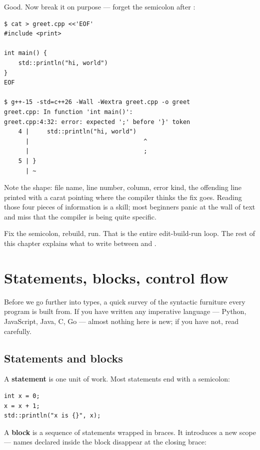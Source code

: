 Good. Now break it on purpose --- forget the semicolon after
:

\begin{lstlisting}[style=shell]
$ cat > greet.cpp <<'EOF'
#include <print>

int main() {
    std::println("hi, world")
}
EOF

$ g++-15 -std=c++26 -Wall -Wextra greet.cpp -o greet
greet.cpp: In function 'int main()':
greet.cpp:4:32: error: expected ';' before '}' token
    4 |     std::println("hi, world")
      |                                ^
      |                                ;
    5 | }
      | ~
\end{lstlisting}

Note the shape: file name, line number, column, error kind, the
offending line printed with a carat pointing where the compiler
thinks the fix goes. Reading those four pieces of information is a
skill; most beginners panic at the wall of text and miss that the
compiler is being quite specific.

Fix the semicolon, rebuild, run. That is the entire edit-build-run
loop. The rest of this chapter explains what to write between
 and \code{\}}.

\section{Statements, blocks, control flow}
\label{sec:cpp:flow}

Before we go further into types, a quick survey of the syntactic
furniture every \cpp{} program is built from. If you have written
any imperative language --- Python, JavaScript, Java, C, Go ---
almost nothing here is new; if you have not, read carefully.

\subsection{Statements and blocks}

A \textbf{statement} is one unit of work. Most statements end with a
semicolon:

\begin{lstlisting}
int x = 0;
x = x + 1;
std::println("x is {}", x);
\end{lstlisting}

A \textbf{block} is a sequence of statements wrapped in braces. It
introduces a new scope --- names declared inside the block disappear
at the closing brace:

